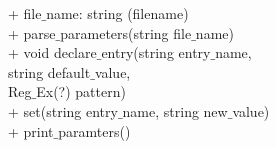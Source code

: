 {
+ file$\_$name: string
}
{
\dunder(filename)\\
+ parse$\_$parameters(string file$\_$name) \\
+ void declare$\_$entry(string entry$\_$name, \\ string default$\_$value, \\ Reg$\_$Ex(?) pattern)\\
+ set(string entry$\_$name, string new$\_$value)\\
+ print$\_$paramters()
}
